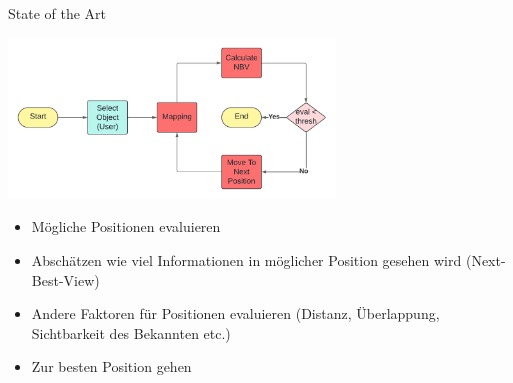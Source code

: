 \documentclass{beamer}
\begin{document}
\begin{frame}{State of the Art}
	\begin{center}
		\includegraphics[width=0.65\textwidth]{Graphics/flow_chart.pdf}
	\end{center}

	\begin{block}{}
		\begin{itemize}
			\item Mögliche Positionen evaluieren
			\item Abschätzen wie viel Informationen in möglicher Position gesehen wird (Next-Best-View)
			\item Andere Faktoren für Positionen evaluieren (Distanz, Überlappung, Sichtbarkeit des Bekannten etc.)
			\item Zur besten Position gehen
		\end{itemize}
	\end{block}
\end{frame}
\end{document}
